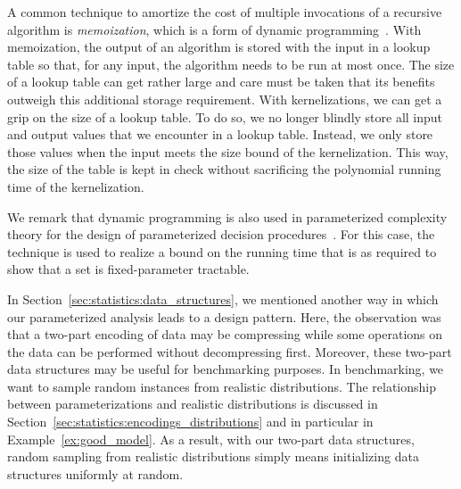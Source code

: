 A common technique to amortize the cost of multiple invocations of a recursive algorithm is \emph{memoization}, which is a form of dynamic programming~\parencite[see][Chapter~16]{cormen2009introduction}.
With memoization, the output of an algorithm is stored with the input in a lookup table so that, for any input, the algorithm needs to be run at most once.
The size of a lookup table can get rather large and care must be taken that its benefits outweigh this additional storage requirement.
With kernelizations, we can get a grip on the size of a lookup table.
To do so, we no longer blindly store all input and output values that we encounter in a lookup table.
Instead, we only store those values when the input meets the size bound of the kernelization.
This way, the size of the table is kept in check without sacrificing the polynomial running time of the kernelization.

We remark that dynamic programming is also used in parameterized complexity theory for the design of parameterized decision procedures~\parencite[see][Chapter~9]{niedermeier2006invitation}.
For this case, the technique is used to realize a bound on the running time that is as required to show that a set is fixed-parameter tractable.

In Section~\ref{sec:statistics:data_structures}, we mentioned another way in which our parameterized analysis leads to a design pattern.
Here, the observation was that a two-part encoding of data may be compressing while some operations on the data can be performed without decompressing first.
Moreover, these two-part data structures may be useful for benchmarking purposes.
In benchmarking, we want to sample random instances from realistic distributions.
The relationship between parameterizations and realistic distributions is discussed in Section~\ref{sec:statistics:encodings_distributions} and in particular in Example~\ref{ex:good_model}.
As a result, with our two-part data structures, random sampling from realistic distributions simply means initializing data structures uniformly at random.

